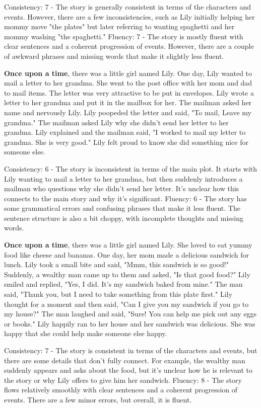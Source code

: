 \documentclass{article}
\begin{document}
Consistency: 7 - The story is generally consistent in terms of the characters and events. However, there are a few inconsistencies, such as Lily initially helping her mommy move "the plates" but later referring to wanting spaghetti and her mommy washing "the spaghetti."
Fluency: 7 - The story is mostly fluent with clear sentences and a coherent progression of events. However, there are a couple of awkward phrases and missing words that make it slightly less fluent.

\textbf{Once upon a time}, there was a little girl named Lily. One day, Lily wanted to mail a letter to her grandma. She went to the post office with her mom and dad to mail items. The letter was very attractive to be put in envelopes. Lily wrote a letter to her grandma and put it in the mailbox for her. The mailman asked her name and nervously Lily. Lily poopeded the letter and said, "To mail, Leave my grandma." The mailman asked Lily why she didn't send her letter to her grandma. Lily explained and the mailman said, "I worked to mail my letter to grandma. She is very good." Lily felt proud to know she did something nice for someone else.

Consistency: 6 - The story is inconsistent in terms of the main plot. It starts with Lily wanting to mail a letter to her grandma, but then suddenly introduces a mailman who questions why she didn't send her letter. It's unclear how this connects to the main story and why it's significant.
Fluency: 6 - The story has some grammatical errors and confusing phrases that make it less fluent. The sentence structure is also a bit choppy, with incomplete thoughts and missing words.

\textbf{Once upon a time}, there was a little girl named Lily. She loved to eat yummy food like cheese and bananas. One day, her mom made a delicious sandwich for lunch. Lily took a small bite and said, "Mmm, this sandwich is so good!" Suddenly, a wealthy man came up to them and asked, "Is that good food?" Lily smiled and replied, "Yes, I did. It's my sandwich baked from mine." The man said, "Thank you, but I need to take something from this plate first." Lily thought for a moment and then said, "Can I give you my sandwich if you go to my house?" The man laughed and said, "Sure! You can help me pick out any eggs or books." Lily happily ran to her house and her sandwich was delicious. She was happy that she could help make someone else happy.

Consistency: 7 - The story is consistent in terms of the characters and events, but there are some details that don't fully connect. For example, the wealthy man suddenly appears and asks about the food, but it's unclear how he is relevant to the story or why Lily offers to give him her sandwich.
Fluency: 8 - The story flows relatively smoothly with clear sentences and a coherent progression of events. There are a few minor errors, but overall, it is fluent.
\end{document}
